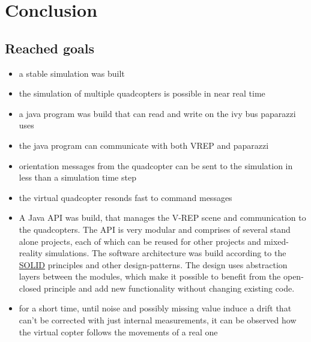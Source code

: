 \chapter{Conclusion}
\label{sec:conclusion}


\section{Reached goals}
\begin{itemize}
\item{a stable simulation was built}
\item{the simulation of multiple quadcopters is possible in near real time}
\item{a java program was build that can read and write on the ivy bus paparazzi uses}
\item{the java program can communicate with both VREP and paparazzi}
\item{orientation messages from the quadcopter can be sent to the simulation in less than a simulation time step}
\item{the virtual quadcopter resonds fast to command messages}
\item{
A Java API was build, that manages the V-REP scene and communication to the quadcopters. The API is very modular and comprises of several stand alone projects, each of which can be reused for other projects and mixed-reality simulations. The software architecture was build according to the  \href{https://en.wikipedia.org/wiki/SOLID_28object-oriented_design}{SOLID} principles and other design-patterns. The design uses abstraction layers between the modules, which make it possible to benefit from the open-closed principle and add new functionality without changing existing code.
}

\item{for a short time, until noise and possibly missing value induce a drift that can't be corrected with just internal measurements, it can be observed how the virtual copter follows the movements of a real one}
\end{itemize}




